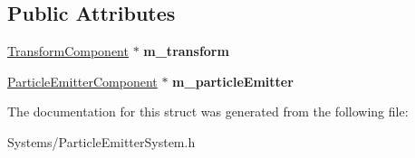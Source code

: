 \subsection*{Public Attributes}
\begin{DoxyCompactItemize}
\item 
\mbox{\label{structParticleEmitterCompNode_a7d6d649d161b57cf65562c715a075bd7}} 
\hyperlink{classTransformComponent}{Transform\+Component} $\ast$ {\bfseries m\+\_\+transform}
\item 
\mbox{\label{structParticleEmitterCompNode_a5e9c58b8fefc85a6c237b82462e77e5c}} 
\hyperlink{classParticleEmitterComponent}{Particle\+Emitter\+Component} $\ast$ {\bfseries m\+\_\+particle\+Emitter}
\end{DoxyCompactItemize}


The documentation for this struct was generated from the following file\+:\begin{DoxyCompactItemize}
\item 
Systems/Particle\+Emitter\+System.\+h\end{DoxyCompactItemize}
